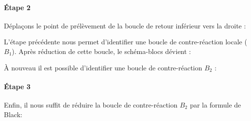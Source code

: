 \paragraph{\'Etape 2}
Déplaçons le point de prélèvement de la boucle de retour inférieur vers 
la droite  : 
\begin{center}
    
\end{center}
L'étape précédente nous permet d'identifier une boucle de contre-réaction 
locale ($B_1$). Après réduction de cette boucle, le schéma-blocs dévient : 
\begin{center}
    
\end{center}
\`A nouveau il est possible d'identifier une boucle de contre-réaction $B_2$ :
\begin{center}
    
\end{center}
\paragraph{\'Etape 3}
Enfin, il nous suffit de réduire la boucle de contre-réaction $B_2$ par la 
formule de Black:
\begin{center}
    
\end{center}
